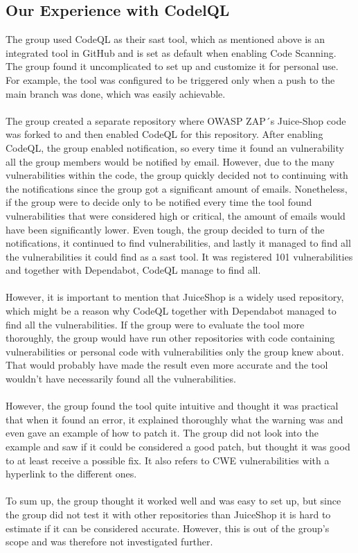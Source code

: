 \subsection{Our Experience with CodelQL}
The group used CodeQL as their \acrshort{sast} tool, which as mentioned above is an integrated tool in GitHub and is set as default when enabling Code Scanning. The group found it uncomplicated to set up and customize it for personal use. For example, the tool was configured to be triggered only when a push to the main branch was done, which was easily achievable. 
\\~\\
The group created a separate repository where OWASP ZAP´s Juice-Shop code was forked to and then enabled CodeQL for this repository. After enabling CodeQL, the group enabled notification, so every time it found an vulnerability all the group members would be notified by email. However, due to the many vulnerabilities within the code, the group quickly decided not to continuing with the notifications since the group got a significant amount of emails. Nonetheless, if the group were to decide only to be notified every time the tool found vulnerabilities that were considered high or critical, the amount of emails would have been significantly lower. Even tough, the group decided to turn of the notifications, it continued to find vulnerabilities, and lastly it managed to find all the vulnerabilities it could find as a \acrshort{sast} tool. It was registered 101 vulnerabilities and together with Dependabot, CodeQL manage to find all.  
\\~\\
However, it is important to mention that JuiceShop is a widely used repository, which might be a reason why CodeQL together with Dependabot managed to find all the vulnerabilities. If the group were to evaluate the tool more thoroughly, the group would have run other repositories with code containing vulnerabilities or personal code with vulnerabilities only the group knew about. That would probably have made the result even more accurate and the tool wouldn't have necessarily found all the vulnerabilities. 
\\~\\
However, the group found the tool quite intuitive and thought it was practical that when it found an error, it explained thoroughly what the warning was and even gave an example of how to patch it. The group did not look into the example and saw if it could be considered a good patch, but thought it was good to at least receive a possible fix. It also refers to CWE vulnerabilities with a hyperlink to the different ones. 
\\~\\
To sum up, the group thought it worked well and was easy to set up, but since the group did not test it with other repositories than JuiceShop it is hard to estimate if it can be considered accurate. However, this is out of the group's scope and was therefore not investigated further. 



